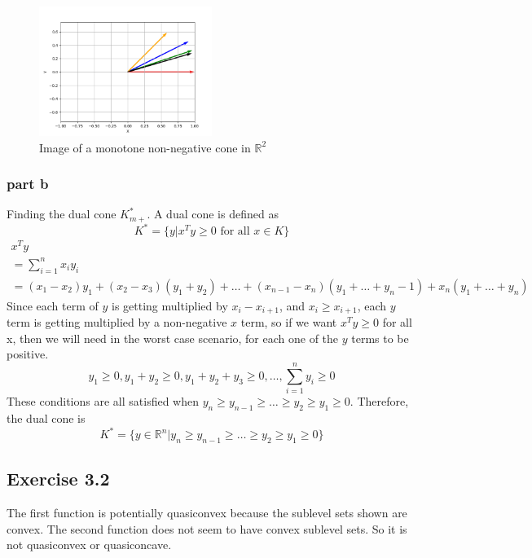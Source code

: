 \begin{figure}[htbp]
  \centerline{\includegraphics[width=0.50\textwidth]{hw2/images/exercise233cone.png}}
  \caption{Image of a monotone non-negative cone in $\mathbb{R}^2$}
  \label{fig:exercise233cone}
\end{figure}
\subsubsection{part b}
Finding the dual cone $K_{m+}^*$. A dual cone is defined as 
\begin{equation}
  K^* = \{ y | x^T y \geq 0 \text{ for all } x\in K \}
\end{equation}
\begin{gather}
  x^T y \\
  = \sum_{i=1}^n x_i y_i \\
  = (x_1 - x_2)y_1 + (x_2 -x_3)(y_1+y_2) + \dots + (x_{n-1} - x_n)(y_1+\dots + y_n-1) + x_n(y_1+\dots + y_n)
\end{gather}
Since each term of $y$ is getting multiplied by $x_i - x_{i+1}$, and $x_i \geq x_{i+1}$, each $y$ term is getting multiplied by a non-negative $x$ term, so if we want $x^T y \geq 0$ for all x, then we will need in the worst case scenario, for each one of the $y$ terms to be positive.
\begin{equation}
  y_1 \geq 0, y_1 + y_2 \geq 0, y_1 + y_2 + y_3 \geq 0, \dots, \sum_{i=1}^{n} y_i \geq 0
\end{equation}
These conditions are all satisfied when $y_n \geq y_{n-1} \geq \dots \geq y_2 \geq y_1 \geq 0$. Therefore, the dual cone is 
\begin{equation}
  K^* = \{ y \in \mathbb{R}^n | y_n \geq y_{n-1} \geq \dots \geq y_2 \geq y_1 \geq 0\}
\end{equation}
\subsection{Exercise 3.2}
The first function is potentially quasiconvex because the sublevel sets shown are convex. The second function does not seem to have convex sublevel sets. So it is not quasiconvex or quasiconcave.
